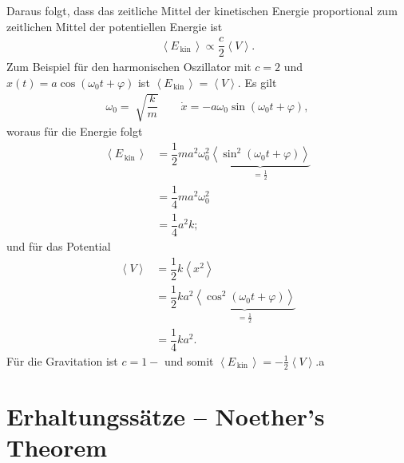 \documentclass[a4paper,12pt]{article}
\numberwithin{equation}{section}
\begin{document}
Daraus folgt, dass das zeitliche Mittel der kinetischen Energie proportional zum zeitlichen Mittel der potentiellen Energie ist
\begin{align*}
        \left\langle E_{\,\text{kin}\,}\right\rangle \propto \dfrac{c}{2}\left\langle V\right\rangle 
.\end{align*}
Zum Beispiel für den harmonischen Oszillator mit $c=2$ und $x(t)=a\cos \left(\omega _0t+\varphi \right)$ ist $\left\langle E_{\,\text{kin}\,}\right\rangle =\left\langle V\right\rangle $. Es gilt
\begin{align*}
        \omega _0=\sqrt[]{\dfrac{k}{m}}\qquad \dot{x}=-a\omega _0\sin \left(\omega _0t+\varphi \right)
,\end{align*}
woraus für die Energie folgt
\begin{align*}
        \left\langle E_{\,\text{kin}\,}\right\rangle &=\dfrac{1}{2}ma^2\omega _0^2\underbrace{\left\langle \sin ^2\left(\omega _0t+\varphi \right)\right\rangle }_{=\tfrac{1}{2}}\\
                                                     &=\dfrac{1}{4}ma^2\omega _0^2\\
                                                     &=\dfrac{1}{4}a^2k
;\end{align*}
und für das Potential
\begin{align*}
        \left\langle V\right\rangle &=\dfrac{1}{2}k\left\langle x^2\right\rangle \\
                                    &=\dfrac{1}{2}ka^2\underbrace{\left\langle \cos ^2\left(\omega _0t+\varphi \right)\right\rangle }_{=\tfrac{1}{2}}\\
                                    &=\dfrac{1}{4}ka^2
.\end{align*}
Für die Gravitation ist $c=1-$ und somit $\left\langle E_{\,\text{kin}\,}\right\rangle =-\tfrac{1}{2}\left\langle V\right\rangle $.a

\newpage
\section{Erhaltungssätze -- Noether's Theorem}
\end{document}
